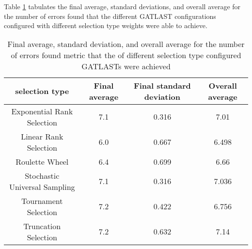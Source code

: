 Table \ref{tab:HP:GA:selectionMethod:number of errors found} tabulates the final average, standard deviations, and overall average for the number of errors found that the different GATLAST configurations configured with different selection type weights were able to achieve.
\begin{table}[tbh!]
\centering
\begin{adjustbox}{trim=0cm 0cm 0cm 0cm, clip=true}
\begin{tabular}{|c|c|c|c|}
\hline
selection type & Final average & Final standard deviation & Overall average\\
\hline
Exponential Rank Selection & 7.1 & 0.316 & 7.01\\\hline
Linear Rank Selection & 6.0 & 0.667 & 6.498\\\hline
Roulette Wheel & 6.4 & 0.699 & 6.66\\\hline
Stochastic Universal Sampling & 7.1 & 0.316 & 7.036\\\hline
Tournament Selection & 7.2 & 0.422 & 6.756\\\hline
Truncation Selection & 7.2 & 0.632 & 7.14\\\hline
\end{tabular}
\end{adjustbox}
\caption{Final average, standard deviation, and overall average for the number of errors found metric that the of different selection type configured GATLASTs were achieved}
\label{tab:HP:GA:selectionMethod:number of errors found}
\end{table}